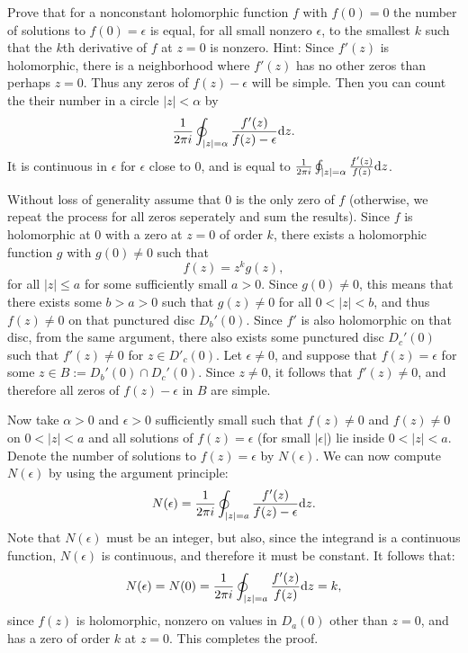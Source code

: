 \documentclass[11pt, a4paper]{article}
\begin{document}
\begin{exercise}
  Prove that for a nonconstant holomorphic function $f$ with $f(0) = 0$
  the number of solutions to $f(0) = \epsilon$ is equal,
  for all small nonzero $\epsilon$,
  to the smallest $k$ such that the $k$th derivative of $f$ at $z = 0$
  is nonzero.
  Hint: Since $f'(z)$ is holomorphic, there is a neighborhood where $f'(z)$ has
  no other zeros than perhaps $z = 0$.
  Thus any zeros of $f(z) - \epsilon$ will be simple.
  Then you can count the their number in a circle $|z| < \alpha$ by
  \[
    \frac{1}{2 \pi i} \oint_{|z| = \alpha} \frac{f'(z)}{f(z) - \epsilon} \mathrm{d} z.
  \]
  It is continuous in $\epsilon$ for $\epsilon$ close to $0$,
  and is equal to
  $\frac{1}{2 \pi i} \oint_{|z| = \alpha} \frac{f'(z)}{f(z)} \mathrm{d} z$.
\end{exercise}
\begin{solution}
  Without loss of generality assume that $0$ is the only zero of $f$
  (otherwise, we repeat the process for all zeros seperately and sum
  the results).
  Since $f$ is holomorphic at $0$ with a zero at $z = 0$ of order $k$,
  there exists a holomorphic function $g$ with $g(0) \neq 0$ such that
  \[
    f(z) = z^k g(z),
  \]
  for all $|z| \le a$ for some sufficiently small $a > 0$.
  Since $g(0) \neq 0$, this means that there exists some $b > a > 0$
  such that $g(z) \neq 0$ for all $0 < |z| < b$, and thus $f(z) \neq 0$
  on that punctured disc $D_b'(0)$.
  Since $f'$ is also holomorphic on that disc, from the same argument,
  there also exists some punctured disc $D_c'(0)$ such that
  $f'(z) \neq 0$ for $z \in D'_c(0)$.
  Let $\epsilon \neq 0$, and suppose that $f(z) = \epsilon$
  for some $z \in B := D_b'(0) \cap D_c'(0)$.
  Since $z \neq 0$, it follows that $f'(z) \neq 0$,
  and therefore all zeros of $f(z) - \epsilon$ in $B$
  are simple.

  Now take $\alpha > 0$ and $\epsilon > 0$
  sufficiently small such that $f(z) \neq 0$ and $f(z) \neq 0$
  on $0 < |z| < a$ and all solutions of $f(z) = \epsilon$
  (for small $|\epsilon|$) lie inside $0 < |z| < a$.
  Denote the number of solutions to $f(z) = \epsilon$ by $N(\epsilon)$.
  We can now compute $N(\epsilon)$ by using the argument principle:
  \[
    N(\epsilon) =
    \frac{1}{2 \pi i} \oint_{|z| = a} \frac{f'(z)}{f(z) - \epsilon} \mathrm{d} z.
  \]
  Note that $N(\epsilon)$ must be an integer,
  but also, since the integrand is a continuous function,
  $N(\epsilon)$ is continuous, and therefore it must be constant.
  It follows that:
  \[
    N(\epsilon) = N(0) =
    \frac{1}{2 \pi i} \oint_{|z| = a} \frac{f'(z)}{f(z)} \mathrm{d} z = k,
  \]
  since $f(z)$ is holomorphic, nonzero on values in $D_a(0)$ other than
  $z = 0$, and has a zero of order $k$ at $z = 0$.
  This completes the proof.
\end{solution}
\end{document}
